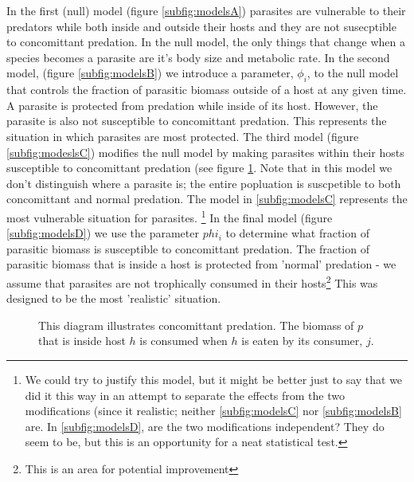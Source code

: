 \documentclass[11pt]{amsart}
\begin{document}
In the first (null) model (figure \ref{subfig:modelsA}) parasites are vulnerable to their predators while both inside and outside their hosts and they are not susecptible to concomittant predation.  In the null model, the only things that change when a species becomes a parasite are it's body size and metabolic rate.  In the second model, (figure \ref{subfig:modelsB})  we introduce a parameter, $\phi_i$, to the null model that controls the fraction of parasitic biomass outside of a host at any given time.  A parasite is protected from predation while inside of its host.  However, the parasite is also not susceptible to concomittant predation.  This represents the situation in which parasites are most protected.  The third model (figure \ref{subfig:modeslsC}) modifies the null model by making parasites within their hosts susceptible to concomittant predation (see figure \ref{fig:concDiagram}.  Note that in this model we don't distinguish where a parasite is; the entire popluation is suscpetible to both concomittant and normal predation.  The model in \ref{subfig:modelsC} represents the most vulnerable situation for parasites. \footnote{We could try to justify this model, but it might be better just to say that we did it this way in an attempt to separate the effects from the two modifications (since it  realistic; neither \ref{subfig:modelsC} nor \ref{subfig:modelsB} are. In \ref{subfig:modelsD}, are the two modifications independent?  They do seem to be, but this is an opportunity for a neat statistical test. }  In the final model (figure \ref{subfig:modelsD}) we use the parameter $phi_i$ to determine what fraction of parasitic biomass is susceptible to concomittant predation.  The fraction of parasitic biomass that is inside a host is protected from 'normal' predation - we assume that parasites are not trophically consumed in their hosts\footnote{This is an area for potential improvement}  This was designed to be the most 'realistic' situation.

\begin{figure}
\caption{This diagram illustrates concomittant predation.  The biomass of $p$ that is inside host $h$ is consumed when $h$ is eaten by its consumer, $j$. \label{fig:concDiagram}}
\end{figure}
\end{document}
